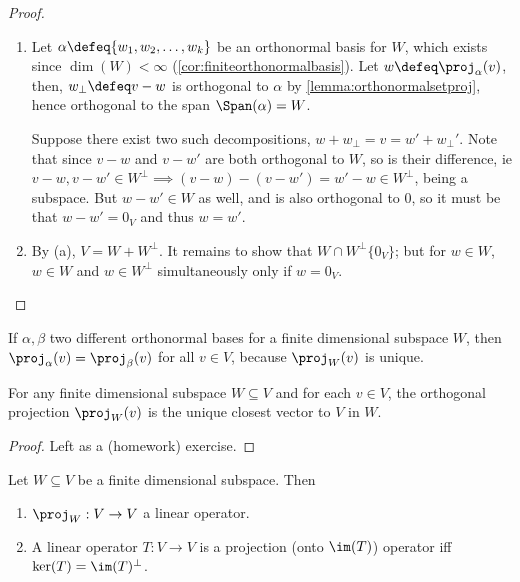\begin{proof}
    \begin{enumerate}[label=(\alph*)]
        \item {} Let $\alpha \defeq \{w_1, w_2, \dots, w_k\}$ be an orthonormal basis for $W$, which exists since $\dim(W) < \infty$ (\cref{cor:finiteorthonormalbasis}). Let $w \defeq \proj_\alpha(v)$, then, $w_\perp \defeq v - w$ is orthogonal to $\alpha$ by \cref{lemma:orthonormalsetproj}, hence orthogonal to the span $\Span(\alpha) = W$.
        
         Suppose there exist two such decompositions, $w + w_\perp = v = w' + w_\perp'$. Note that since $v - w$ and $v - w'$ are both orthogonal to $W$, so is their difference, ie $v -w,  v - w' \in W^\perp \implies (v- w) - (v - w')  = w' - w\in W^\perp$, being a subspace. But $w - w' \in W$ as well, and is also orthogonal to $0$, so it must be that $w - w' = 0_V$ and thus $w = w'$.
        
        \item By (a), $V = W + W^\perp$. It remains to show that $W \cap W^\perp \{0_V\}$; but for $w \in W$, $w \in W$ and $w \in W^\perp$ simultaneously only if $w = 0_V$.
    \end{enumerate}
\end{proof}

\begin{remark}
    If $\alpha, \beta$ two different orthonormal bases for a finite dimensional subspace $W$, then $\proj_\alpha(v) = \proj_\beta(v)$ for all $v \in V$, because $\proj_W(v)$ is unique.
\end{remark}

\begin{theorem}
    For any finite dimensional subspace $W \subseteq V$ and for each $v \in V$, the orthogonal projection $\proj_W(v)$ is the unique closest vector to $V$ in $W$.
\end{theorem}

\begin{proof}
    Left as a (homework) exercise.
\end{proof}

\begin{proposition}
    Let $W \subseteq V$ be a finite dimensional subspace. Then \begin{enumerate}[label=(\alph*)]
        \item $\proj_W: V \to V$ a linear operator.
        \item A linear operator $T : V \to V$ is a projection (onto $\im(T)$) operator iff $\ker(T) = \im(T)^\perp$.
    \end{enumerate}
\end{proposition}

